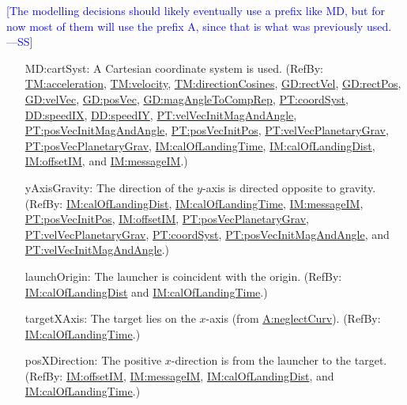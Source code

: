 \documentclass[12pt]{article}
\newcommand{\authornote}[3]{\textcolor{#1}{[#3 ---#2]}}
\newcommand{\authornote}[3]{}
\newcommand{\wss}[1]{\authornote{blue}{SS}{#1}}
\begin{document}
\wss{The modelling decisions should likely eventually use a prefix like MD, but
for now most of them will use the prefix A, since that is what was previously
used.}

\begin{itemize}
\item[MD:cartSyst:\phantomsection\label{MD:cartSyst}]{A Cartesian coordinate system is used. (RefBy: \hyperref[TM:acceleration]{TM:acceleration}, \hyperref[TM:velocity]{TM:velocity}, \hyperref[TM:directionCosines]{TM:directionCosines}, \hyperref[GD:rectVel]{GD:rectVel}, \hyperref[GD:rectPos]{GD:rectPos}, \hyperref[GD:velVec]{GD:velVec}, \hyperref[GD:posVec]{GD:posVec}, \hyperref[GD:magAngleToCompRep]{GD:magAngleToCompRep}, \hyperref[PT:coordSyst]{PT:coordSyst}, \hyperref[DD:speedIX]{DD:speedIX}, \hyperref[DD:speedIY]{DD:speedIY}, \hyperref[PT:velVecInitMagAndAngle]{PT:velVecInitMagAndAngle}, \hyperref[PT:posVecInitMagAndAngle]{PT:posVecInitMagAndAngle}, \hyperref[PT:posVecInitPos]{PT:posVecInitPos}, \hyperref[PT:velVecPlanetaryGrav]{PT:velVecPlanetaryGrav}, \hyperref[PT:posVecPlanetaryGrav]{PT:posVecPlanetaryGrav}, \hyperref[IM:calOfLandingTime]{IM:calOfLandingTime}, \hyperref[IM:calOfLandingDist]{IM:calOfLandingDist}, \hyperref[IM:offsetIM]{IM:offsetIM}, and \hyperref[IM:messageIM]{IM:messageIM}.)}
\item[yAxisGravity:\phantomsection\label{yAxisGravity}]{The direction of the $y$-axis is directed opposite to gravity. (RefBy: \hyperref[IM:calOfLandingDist]{IM:calOfLandingDist}, \hyperref[IM:calOfLandingTime]{IM:calOfLandingTime}, \hyperref[IM:messageIM]{IM:messageIM}, \hyperref[PT:posVecInitPos]{PT:posVecInitPos}, \hyperref[IM:offsetIM]{IM:offsetIM}, \hyperref[PT:posVecPlanetaryGrav]{PT:posVecPlanetaryGrav}, \hyperref[PT:velVecPlanetaryGrav]{PT:velVecPlanetaryGrav}, \hyperref[PT:coordSyst]{PT:coordSyst}, \hyperref[PT:posVecInitMagAndAngle]{PT:posVecInitMagAndAngle}, and \hyperref[PT:velVecInitMagAndAngle]{PT:velVecInitMagAndAngle}.)}
\item[launchOrigin:\phantomsection\label{launchOrigin}]{The launcher is coincident with the origin. (RefBy: \hyperref[IM:calOfLandingDist]{IM:calOfLandingDist} and \hyperref[IM:calOfLandingTime]{IM:calOfLandingTime}.)}
\item[targetXAxis:\phantomsection\label{targetXAxis}]{The target lies on the $x$-axis (from \hyperref[neglectCurv]{A:neglectCurv}). (RefBy: \hyperref[IM:calOfLandingTime]{IM:calOfLandingTime}.)}
\item[posXDirection:\phantomsection\label{posXDirection}]{The positive $x$-direction is from the launcher to the target. (RefBy: \hyperref[IM:offsetIM]{IM:offsetIM}, \hyperref[IM:messageIM]{IM:messageIM}, \hyperref[IM:calOfLandingDist]{IM:calOfLandingDist}, and \hyperref[IM:calOfLandingTime]{IM:calOfLandingTime}.)}

\end{itemize}
\end{document}
